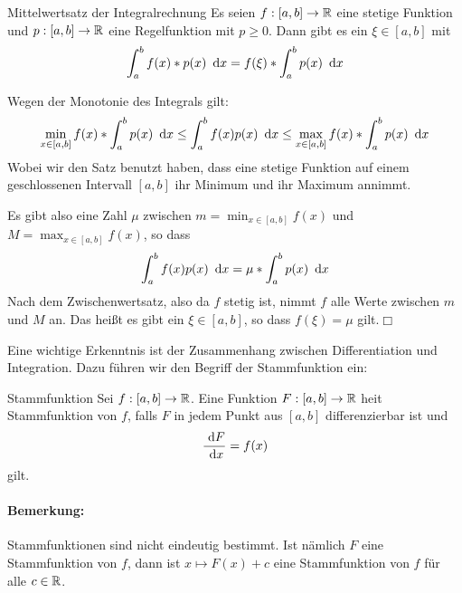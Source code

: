 \begin{satz}{Mittelwertsatz der Integralrechnung}
	Es seien $f:[a,b]\rightarrow\mathbb{R}$ eine stetige Funktion und $p:[a,b]\rightarrow \mathbb{R}$ eine Regelfunktion mit $p\geq 0$. Dann gibt es ein $\xi\in[a,b]$ mit
	\begin{equation*}
		\int_a^b f(x)*p(x)\ \operatorname{d}\! x=f(\xi)*\int_a^b p(x)\ \operatorname{d}\! x
	\end{equation*}
\end{satz}
\begin{beweis}
	Wegen der Monotonie des Integrals gilt:
	\begin{equation*}
		\min_{x\in[a,b]}f(x)*\int_a^b p(x)\ \operatorname{d}\! x\leq \int_a^b f(x)p(x)\ \operatorname{d}\! x\leq \max_{x\in[a,b]}f(x)*\int_a^b p(x)\ \operatorname{d}\! x
	\end{equation*}
	Wobei wir den Satz benutzt haben, dass eine stetige Funktion auf einem geschlossenen Intervall $[a,b]$ ihr Minimum und ihr Maximum annimmt.

	Es gibt also eine Zahl $\mu$ zwischen $m=\min_{x\in[a,b]}f(x)$ und $M=\max_{x\in[a,b]}f(x)$, so dass
	\begin{equation*}
		\int_a^b f(x)p(x)\ \operatorname{d}\! x=\mu*\int_a^b p(x)\ \operatorname{d}\! x
	\end{equation*}
	Nach dem Zwischenwertsatz, also da $f$ stetig ist, nimmt $f$ alle Werte zwischen $m$ und $M$ an. Das heißt es gibt ein $\xi\in[a,b]$, so dass $f(\xi)=\mu$ gilt.\hfill$\Box$
\end{beweis}

Eine wichtige Erkenntnis ist der Zusammenhang zwischen Differentiation und Integration. Dazu führen wir den Begriff der Stammfunktion ein:
\begin{definition}{Stammfunktion}
	Sei $f:[a,b]\rightarrow \mathbb{R}$. Eine Funktion $F:[a,b]\rightarrow\mathbb{R}$ heit Stammfunktion von $f$, falls $F$ in jedem Punkt aus $[a,b]$ differenzierbar ist und
	\begin{equation*}
		\frac{\ \operatorname{d}\! F}{\ \operatorname{d}\! x}=f(x)
	\end{equation*}
	gilt.
\end{definition}
\paragraph{Bemerkung:}
Stammfunktionen sind nicht eindeutig bestimmt. Ist nämlich $F$ eine Stammfunktion von $f$, dann ist $x\mapsto F(x)+c$ eine Stammfunktion von $f$ für alle $c\in\mathbb{R}$.

